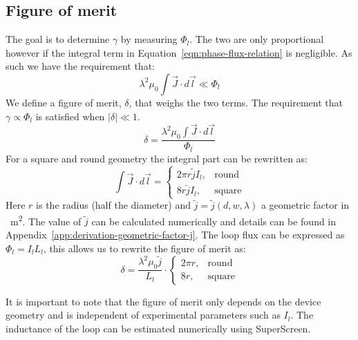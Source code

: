\subsection{Figure of merit}
\label{sec:figure-of-merit}
The goal is to determine $\gamma$ by measuring $\Phi_l$. The two are only proportional however if the integral term in Equation~\ref{eqn:phase-flux-relation} is negligible. As such we have the requirement that:
\begin{equation*}
	\lambda^2\mu_0 \int \vec{J}\cdot d \vec{l} \ll \Phi_l
\end{equation*}
We define a figure of merit, $\delta$, that weighs the two terms. The requirement that $\gamma \propto \Phi_l$ is satisfied when $|\delta| \ll 1$.
\begin{equation}
	\delta = \frac{\lambda^2\mu_0 \int \vec{J}\cdot d \vec{l}}{\Phi_l}
\end{equation}
For a square and round geometry the integral part can be rewritten as:
\begin{equation}
	\int \vec{J}\cdot d \vec{l} = \begin{cases}
		2\pi r \tilde{j} I_l, &\text{round} \\
		8r \tilde{j} I_l, &\text{square}
	\end{cases}
\end{equation}
Here $r$ is the radius (half the diameter) and $\tilde{j} = \tilde{j}(d, w, \lambda)$ a geometric factor in \unit{\per\square\meter}. The value of $\tilde{j}$ can be calculated numerically and details can be found in Appendix~\ref{app:derivation-geometric-factor-j}. The loop flux can be expressed as $\Phi_l = I_lL_l$, this allows us to rewrite the figure of merit as:
\begin{equation}
	\delta = \frac{\lambda^2\mu_0\tilde{j}}{L_l} \cdot \begin{cases}
		2\pi r, &\text{round} \\
		8r, &\text{square}
	\end{cases}
	\label{eqn:figure-of-merit}
\end{equation}

It is important to note that the figure of merit only depends on the device geometry and is independent of experimental parameters such as $I_l$. The inductance of the loop can be estimated numerically using SuperScreen.\cite{bishop-vanhornSuperScreenOpensourcePackage2022}

